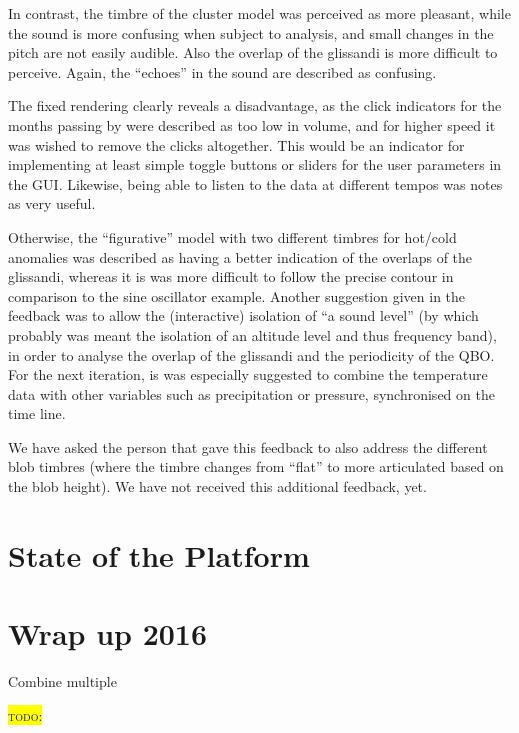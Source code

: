 \documentclass[11pt,a4paper]{article}
\newcommand{\todo}[1]{\colorbox{yellow}{\textsc{todo}: #1}}
\begin{document}
In contrast, the timbre of the cluster model was perceived as more pleasant, while the sound is more confusing when subject to analysis, and small changes in the pitch are not easily audible. Also the overlap of the glissandi is more difficult to perceive. Again, the ``echoes'' in the sound are described as confusing.

The fixed rendering clearly reveals a disadvantage, as the click indicators for the months passing by were described as too low in volume, and for higher speed it was wished to remove the clicks altogether. This would be an indicator for implementing at least simple toggle buttons or sliders for the user parameters in the GUI. Likewise, being able to listen to the data at different tempos was notes as very useful.

Otherwise, the ``figurative'' model with two different timbres for hot/cold anomalies was described as having a better indication of the overlaps of the glissandi, whereas it is was more difficult to follow the precise contour in comparison to the sine oscillator example. Another suggestion given in the feedback was to allow the (interactive) isolation of ``a sound level'' (by which probably was meant the isolation of an altitude level and thus frequency band), in order to analyse the overlap of the glissandi and the periodicity of the QBO. For the next iteration, is was especially suggested to combine the temperature data with other variables such as precipitation or pressure, synchronised on the time line.

We have asked the person that gave this feedback to also address the different blob timbres (where the timbre changes from ``flat'' to more articulated based on the blob height). We have not received this additional feedback, yet.

\section{State of the Platform}



\section{Wrap up 2016}

Combine multiple


\todo{}
\end{document}
